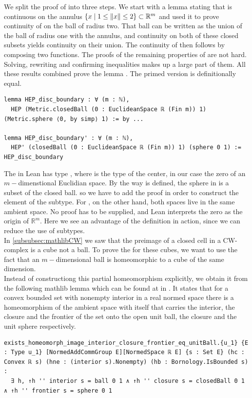 \documentclass[11pt, a4paper, english]{article}
\DeclarePairedDelimiter\norm{\lVert}{\rVert}
\theoremstyle{plain}
\theoremstyle{definition}
\theoremstyle{remark}
\numberwithin{equation}{section}
\numberwithin{theorem}{section}
\begin{document}
We split the  proof of  into three steps. We start with a lemma stating that  is continuous on the annulus $ \{ x \mid 1 \le \norm{x} \le 2  \} \subset \mathbb{R}^m$ and used it to prove continuity of  on the ball of radius two. That ball can be written as the union of the ball of radius one with the annulus, and continuity on both of these closed subsets yields continuity on their union. The continuity of  then follows by composing two  functions. The proofs of the remaining properties of  are not hard. Solving, rewriting and confirming inequalities makes up a large part of them. All these results combined prove the lemma . The primed version  is definitionally equal. 

\begin{verbatim}
lemma HEP_disc_boundary : ∀ (m : ℕ),
  HEP (Metric.closedBall (0 : EuclideanSpace ℝ (Fin m)) 1) (Metric.sphere ⟨0, by simp⟩ 1) := by ...

lemma HEP_disc_boundary' : ∀ (m : ℕ),
  HEP' (closedBall (0 : EuclideanSpace ℝ (Fin m)) 1) (sphere 0 1) := HEP_disc_boundary
\end{verbatim}

The  in Lean has type , where  is the type of the center, in our case the zero of an $m-$dimenstional Euclidian space. By the way  is defined, the sphere in  is a subset of the closed ball. so we have to add the  proof in order to construct the element of the subtype. For , on the other hand, both spaces live in the same ambient space. No proof has to be supplied, and  Lean interprets the zero as the origin of $\mathbb{R}^m$. Here we see an advantage of the  definition in action, since we can reduce the use of subtypes. \\
In \cref{subsubsec:mathlibCW} we saw that the preimage of a closed cell in a CW-complex is a cube not a ball. To prove the  for these cubes, we want to use the fact that an $m-$dimensional ball is homeomorphic to a cube of the same dimension. \\
Instead of constructiong this partial homeomorphism explicitly, we obtain it from the following mathlib lemma which can be found at  in \cite{mathlib}. It states that for a convex bounded set with nonempty interior in a real normed space there is a homeomorphism of the ambient space with itself that carries the interior, the closure and the frontier of the set onto the open unit ball, the closure and the unit sphere respectively. 
\begin{verbatim}
exists_homeomorph_image_interior_closure_frontier_eq_unitBall.{u_1} {E : Type u_1} [NormedAddCommGroup E][NormedSpace ℝ E] {s : Set E} (hc : Convex ℝ s) (hne : (interior s).Nonempty) (hb : Bornology.IsBounded s) :
  ∃ h, ↑h '' interior s = ball 0 1 ∧ ↑h '' closure s = closedBall 0 1 ∧ ↑h '' frontier s = sphere 0 1
\end{verbatim}
\end{document}
